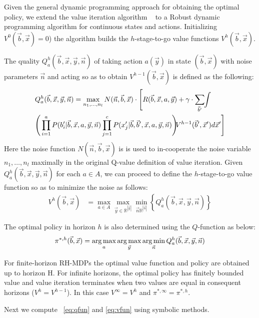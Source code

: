 Given the general dynamic programming approach for obtaining the optimal policy, we extend the value iteration algorithm ~\cite{bellman} to a Robust dynamic programming algorithm for continuous states and actions. Initializing $V^0(\vec{b},\vec{x}) = 0$) the algorithm builds the $h$-stage-to-go value functions $V^h(\vec{b},\vec{x})$.

The quality $Q_a^{h}(\vec{b},\vec{x},\vec{y},\vec{n})$ of taking action $a(\vec{y})$ in state $(\vec{b},\vec{x})$ with noise parameters $\vec{n}$ and acting so as to obtain $V^{h-1}(\vec{b},\vec{x})$ is defined as the following:
\vspace{-4mm}
{\footnotesize
\begin{align}
& Q_a^{h}(\vec{b},\vec{x},\vec{y},\vec{n}) = \max_{n_1,\ldots, n_l} N(\vec{n},\vec{b},\vec{x}) \cdot \Bigg[ R(\vec{b},\vec{x},a,\vec{y}) + \gamma \cdot \sum_{\vec{b}'} \hspace{-1.0mm} \int \hspace{-1.0mm} \nonumber \\
&\Bigg( \prod_{i=1}^a P(b_i'|\vec{b},\vec{x},a,\vec{y},\vec{n})     
\prod_{j=1}^c P(x_j'|\vec{b},\vec{b}',\vec{x},a,\vec{y},\vec{n}) \Bigg)  \hspace{-1.0mm} V^{h-1}(\vec{b}',\vec{x}') d\vec{x}' \Bigg] \hspace{-0.2mm} \label{eq:qfun} 
\end{align}}
Here the noise function $N(\vec{n},\vec{b},\vec{x})$ is is used to in-cooperate the noise variable $n_1,\ldots,n_l$ maximally in the original Q-value definition of value iteration. Given $Q_a^h(\vec{b},\vec{x},\vec{y},\vec{n})$ for each $a \in A$, we can proceed to define the $h$-stage-to-go value function so as to minimize the noise as follows:
\begin{align}
V^{h}(\vec{b},\vec{x}) & = \max_{a \in A} \max_{\vec{y} \in \mathbb{R}^{|\vec{y}|}} \min_{\vec{n} \mathbb{R}^{|\vec{n}|}} \left\{ Q^{h}_a(\vec{b},\vec{x},\vec{y},\vec{n}) \right\} \label{eq:vfun}
\end{align}

The optimal policy in horizon $h$ is also determined using the $Q$-function as below: 
\begin{align}
\pi^{*,h}(\vec{b},\vec{x}) = \argmax_a  \argmax_{\vec{y}}  \argmin_{\vec{n}}  Q^h_a(\vec{b},\vec{x},\vec{y},\vec{n})
\end{align}

For finite-horizon RH-MDPs the optimal value function and policy are obtained up to horizon H.  For infinite horizons, the optimal policy has finitely bounded value and value iteration terminates when two values are equal in consequent horizons ($V^{h} = V^{h-1}$). In this case $V^\infty = V^h$ and $\pi^{*,\infty} = \pi^{*,h}$.

Next  we compute ~\eqref{eq:qfun} and \eqref{eq:vfun} using symbolic methods.